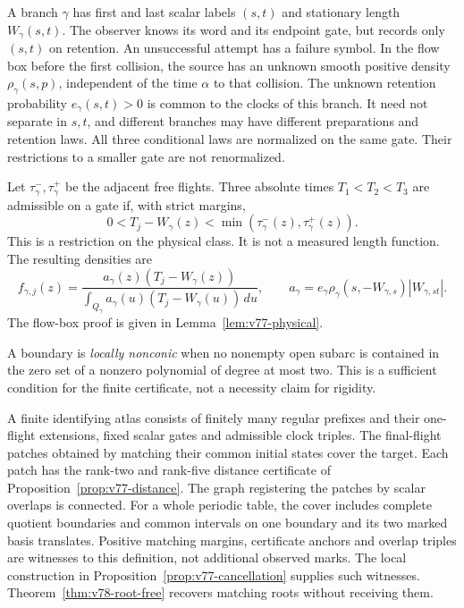 A branch $\gamma$ has first and last scalar labels $(s,t)$ and
stationary length $W_\gamma(s,t)$.  The observer knows its word and its
endpoint gate, but records only $(s,t)$ on retention.  An unsuccessful
attempt has a failure symbol.  In the flow box before the first collision,
the source has an unknown smooth positive density $\rho_\gamma(s,p)$,
independent of the time $\alpha$ to that collision.  The unknown
retention probability $e_\gamma(s,t)>0$ is common to the clocks of this
branch.  It need not separate in $s,t$, and different branches may have
different preparations and retention laws.  All three conditional laws
are normalized on the same gate.  Their restrictions to a smaller gate
are not renormalized.

Let $\tau^-_\gamma,\tau^+_\gamma$ be the adjacent free flights.  Three
absolute times $T_1<T_2<T_3$ are admissible on a gate if, with strict
margins,
\begin{equation}\label{eq:v77-window}
 0<T_j-W_\gamma(z)<\min(\tau^-_\gamma(z),\tau^+_\gamma(z)).
\end{equation}
This is a restriction on the physical class.  It is not a measured
length function.  The resulting densities are
\begin{equation}\label{eq:v78-intro-law}
 f_{\gamma,j}(z)=
 \frac{a_\gamma(z)(T_j-W_\gamma(z))}
 {\int_{Q_\gamma}a_\gamma(u)(T_j-W_\gamma(u))\,du},\qquad
 a_\gamma=e_\gamma\rho_\gamma(s,-W_{\gamma,s})
                   |W_{\gamma,st}|.
\end{equation}
The flow-box proof is given in Lemma~\ref{lem:v77-physical}.

A boundary is \emph{locally nonconic} when no nonempty open subarc
is contained in the zero set of a nonzero polynomial of degree at most two.
This is a sufficient condition for the finite certificate, not a
necessity claim for rigidity.

\begin{definition}\label{def:v77-atlas}
A finite identifying atlas consists of finitely many regular prefixes
and their one-flight extensions, fixed scalar gates and admissible clock
triples.  The final-flight patches obtained by matching their common
initial states cover the target.  Each patch has the rank-two and
rank-five distance certificate of Proposition~\ref{prop:v77-distance}.
The graph registering the patches by scalar overlaps is connected.
For a whole periodic table, the cover includes complete quotient
boundaries and common intervals on one boundary and its two marked basis
translates.  Positive matching margins, certificate anchors and overlap
triples are witnesses to this definition, not additional observed marks.
The local construction in Proposition~\ref{prop:v77-cancellation} supplies
such witnesses.  Theorem~\ref{thm:v78-root-free} recovers matching roots
without receiving them.
\end{definition}

